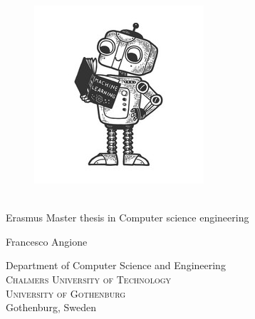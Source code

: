 
\begin{titlepage}
			
\addtolength{\voffset}{2cm}

\begin{figure}
\centering
\vspace{1cm}	%
\includegraphics[scale=1]{figure/cover.jpg}
\end{figure}

\mbox{}
\vfill
\renewcommand{\familydefault}{\sfdefault} \normalfont %

\textbf{\Huge  \multiLineTitle{0.2cm}}\\[0.5cm]



Erasmus Master thesis in Computer science engineering \setlength{\parskip}{1cm}

{\Large Francesco Angione} \setlength{\parskip}{2.9cm}

Department of Computer Science and Engineering \\
\textsc{Chalmers University of Technology} \\
\textsc{University of Gothenburg} \\
Gothenburg, Sweden \the\year

\renewcommand{\familydefault}{\rmdefault} \normalfont %
\end{titlepage}


